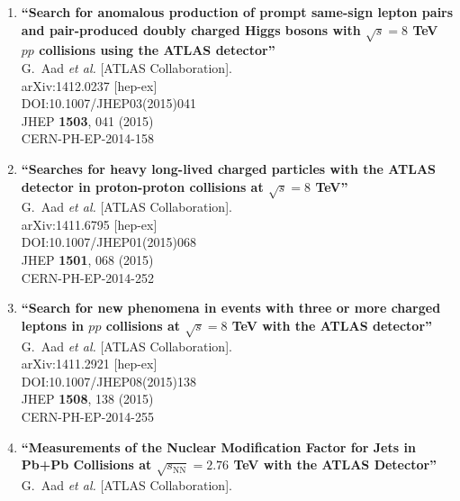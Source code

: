 \documentclass{article}
\begin{document}
\begin{enumerate}
\item%
{\bf ``Search for anomalous production of prompt same-sign lepton pairs and pair-produced doubly charged Higgs bosons with $ \sqrt{s}=8 $ TeV $pp$ collisions using the ATLAS detector''}
  \\{}G.~Aad {\it et al.} [ATLAS Collaboration].
  \\{}arXiv:1412.0237 [hep-ex]
  \\{}DOI:10.1007/JHEP03(2015)041
  \\{}JHEP {\bf 1503}, 041 (2015)
  \\{}CERN-PH-EP-2014-158
\item%
{\bf ``Searches for heavy long-lived charged particles with the ATLAS detector in proton-proton collisions at $ \sqrt{s}=8 $ TeV''}
  \\{}G.~Aad {\it et al.} [ATLAS Collaboration].
  \\{}arXiv:1411.6795 [hep-ex]
  \\{}DOI:10.1007/JHEP01(2015)068
  \\{}JHEP {\bf 1501}, 068 (2015)
  \\{}CERN-PH-EP-2014-252
\item%
{\bf ``Search for new phenomena in events with three or more charged leptons in $pp$ collisions at $\sqrt{s}=8$ TeV with the ATLAS detector''}
  \\{}G.~Aad {\it et al.} [ATLAS Collaboration].
  \\{}arXiv:1411.2921 [hep-ex]
  \\{}DOI:10.1007/JHEP08(2015)138
  \\{}JHEP {\bf 1508}, 138 (2015)
  \\{}CERN-PH-EP-2014-255
\item%
{\bf ``Measurements of the Nuclear Modification Factor for Jets in Pb+Pb Collisions at $\sqrt{s_{\mathrm{NN}}}=2.76$ TeV with the ATLAS Detector''}
  \\{}G.~Aad {\it et al.} [ATLAS Collaboration].

\end{enumerate}
\end{document}

